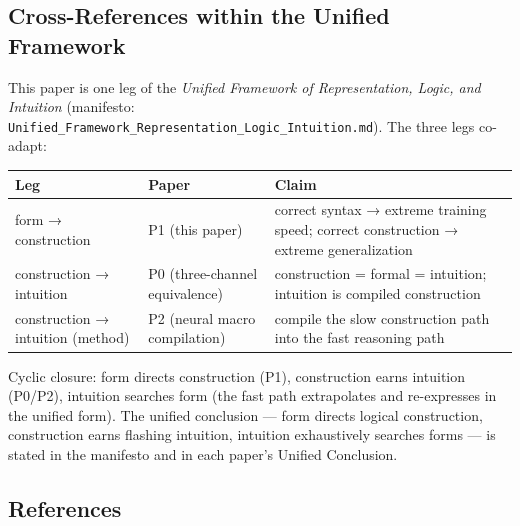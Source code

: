 \documentclass[
]{article}
\begin{document}
\subsection{Cross-References within the Unified
Framework}\label{cross-references-within-the-unified-framework}

This paper is one leg of the \emph{Unified Framework of Representation,
Logic, and Intuition} (manifesto:
\texttt{Unified\_Framework\_Representation\_Logic\_Intuition.md}). The
three legs co-adapt:

\begin{longtable}[]{@{}
  >{\raggedright\arraybackslash}p{}
  >{\raggedright\arraybackslash}p{}
  >{\raggedright\arraybackslash}p{}@{}}
\toprule\noalign{}
\begin{minipage}[b]{\linewidth}\raggedright
Leg
\end{minipage} & \begin{minipage}[b]{\linewidth}\raggedright
Paper
\end{minipage} & \begin{minipage}[b]{\linewidth}\raggedright
Claim
\end{minipage} \\
\midrule\noalign{}
\endhead
\bottomrule\noalign{}
\endlastfoot
form → construction & P1 (this paper) & correct syntax → extreme
training speed; correct construction → extreme generalization \\
construction → intuition & P0 (three-channel equivalence) & construction
= formal = intuition; intuition is compiled construction \\
construction → intuition (method) & P2 (neural macro compilation) &
compile the slow construction path into the fast reasoning path \\
\end{longtable}

Cyclic closure: form directs construction (P1), construction earns
intuition (P0/P2), intuition searches form (the fast path extrapolates
and re-expresses in the unified form). The unified conclusion --- form
directs logical construction, construction earns flashing intuition,
intuition exhaustively searches forms --- is stated in the manifesto and
in each paper's Unified Conclusion.

\subsection{References}\label{references}
\end{document}
